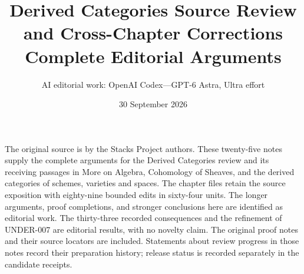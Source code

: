 \documentclass[11pt]{article}
\title{Derived Categories Source Review and Cross-Chapter Corrections\\Complete Editorial Arguments}
\author{AI editorial work: OpenAI Codex---GPT-6 Astra, Ultra effort}
\date{30 September 2026}
\begin{document}
\maketitle
\noindent
The original source is by the Stacks Project authors. These twenty-five notes
supply the complete arguments for the Derived Categories review and its
receiving passages in More on Algebra, Cohomology of Sheaves, and the
derived categories of schemes, varieties and spaces. The chapter files
retain the source exposition with eighty-nine bounded edits in sixty-four units. The longer arguments, proof
completions, and stronger conclusions here are identified as editorial
work. The thirty-three recorded consequences and the refinement of UNDER-007
are editorial results, with no novelty claim.
The original proof notes and their source locators are included. Statements
about review progress in those notes record their preparation history;
release status is recorded separately in the candidate receipts.
\setcounter{secnumdepth}{1}
\makeatletter
\renewcommand\@pnumwidth{2.5em}
\renewcommand\@tocrmarg{3.5em}
\makeatother
\tableofcontents\clearpage
\clearpage
\clearpage
\clearpage
\clearpage
\clearpage
\clearpage
\clearpage
\clearpage
\clearpage
\clearpage
\clearpage
\clearpage
\clearpage
\clearpage
\clearpage
\clearpage
\clearpage
\clearpage
\clearpage
\clearpage
\clearpage
\clearpage
\clearpage
\clearpage
\clearpage
\end{document}
